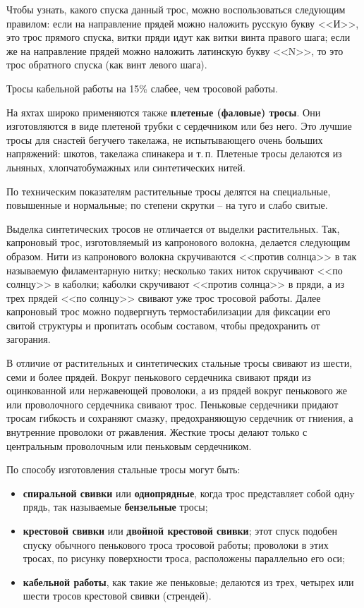 \documentclass[a4paper, 12pt, twoside, final]{scrbook}
\begin{document}
Чтобы узнать, какого спуска данный трос, можно воспользоваться следующим правилом: если на направление прядей можно наложить русскую букву <<И>>, это трос прямого спуска, витки пряди идут как витки винта правого шага; если же на направление прядей можно наложить латинскую букву <<N>>, то это трос обратного спуска (как винт левого шага).

Тросы кабельной работы на 15\% слабее, чем тросовой работы.

На яхтах широко применяются также \textbf{плетеные (фаловые) тросы}. Они изготовляются в виде плетеной трубки с сердечником или без него. Это лучшие тросы для снастей бегучего такелажа, не испытывающего очень больших напряжений: шкотов, такелажа спинакера и т.\,п. Плетеные тросы делаются из льняных, хлопчатобумажных или синтетических нитей.

По техническим показателям растительные тросы делятся на специальные, повышенные и нормальные; по степени скрутки \--- на туго и слабо свитые.

Выделка синтетических тросов не отличается от выделки растительных. Так, капроновый трос, изготовляемый из капронового волокна, делается следующим образом. Нити из капронового волокна скручиваются <<против солнца>> в так называемую филаментарную нитку; несколько таких ниток скручивают <<по солнцу>> в каболки; каболки скручивают <<против солнца>> в пряди, а из трех прядей <<по солнцу>> свивают уже трос тросовой работы. Далее капроновый трос можно подвергнуть термостабилизации для фиксации его свитой структуры и пропитать особым составом, чтобы предохранить от загорания.

В отличие от растительных и синтетических стальные тросы свивают из шести, семи и более прядей. Вокруг пенькового сердечника свивают пряди из оцинкованной или нержавеющей проволоки, а из прядей вокруг пенькового же или проволочного сердечника свивают трос. Пеньковые сердечники придают тросам гибкость и сохраняют смазку, предохраняющую сердечник от гниения, а внутренние проволоки от ржавления. Жесткие тросы делают только с центральным проволочным или пеньковым сердечником.

По способу изготовления стальные тросы могут быть:
\begin{itemize}
\item \textbf{спиральной свивки} или \textbf{однопрядные}, когда трос представляет собой однy прядь, так называемые \textbf{бензельные} тросы;
\item \textbf{крестовой свивки} или \textbf{двойной крестовой свивки}; этот спуск подобен спуску обычного пенькового троса тросовой работы; проволоки в этих тросах, по рисунку поверхности троса, расположены параллельно его оси;
\item \textbf{кабельной работы}, как такие же пеньковые; делаются из трех, четырех или шести тросов крестовой свивки (стрендей).
\end{itemize}
\end{document}
